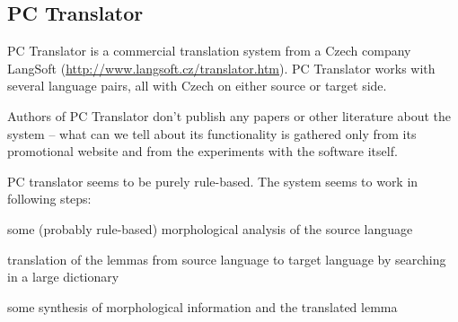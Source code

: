 \begin{comment}
After a \uv{hacky}, but working workaround for this issue, the system returned same correct results on both OS X and Linux. However, I am not at all confident there aren't more similar issues in GNUstep to further develop the system for Russian;
fixing the issues of the standard frameworks, copying API of a closed-source library, that's normally very rarely used, is way beyond the scope of this thesis.


Reading the paper \cite{evalquality_cesilko}, that presents Česílko 2.0 with a very low BLEU, I think the same issue plagued the authors of that paper -- it's unprobable the BLEU of the correctly working system would be that low, when in \cite{cesilko2}, the results of Česílko 2.0 were slightly better than of Česílko 1.0.

\section{Black-box systems}
\label{blackbox}
In this chapter, I am describing all the \uv{black-box} systems -- that is, without any access to the source code -- that we successfully tried.
\end{comment}

\subsection{PC Translator}
\label{langsoft}

PC Translator is a commercial translation system from a Czech company LangSoft (\url{http://www.langsoft.cz/translator.htm}). PC Translator works with several language pairs, all with Czech on either source or target side.

Authors of PC Translator don't publish any papers or other literature about the system -- what can we tell about its functionality is gathered only from its promotional website and from the experiments with the software itself.

PC translator seems to be purely rule-based. The system seems to work in following steps:

\begin{pitemize}
\item some (probably rule-based) morphological analysis of the source language
\item translation of the lemmas from source language to target language by searching in a large dictionary
\item some synthesis of morphological information and the translated lemma
\end{pitemize}

